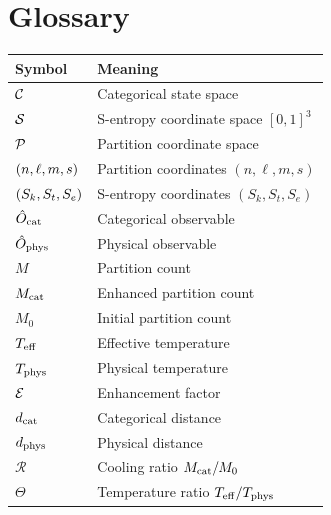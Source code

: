 \section{Glossary}

\begin{center}
\begin{tabular}{ll}
\toprule
\textbf{Symbol} & \textbf{Meaning} \\
\midrule
$\mathcal{C}$ & Categorical state space \\
$\mathcal{S}$ & S-entropy coordinate space $[0,1]^3$ \\
$\mathcal{P}$ & Partition coordinate space \\
$(n,\ell,m,s)$ & Partition coordinates $(n, \ell, m, s)$ \\
$(S_k,S_t,S_e)$ & S-entropy coordinates $(S_k, S_t, S_e)$ \\
$\hat{O}_{\mathrm{cat}}$ & Categorical observable \\
$\hat{O}_{\mathrm{phys}}$ & Physical observable \\
$M$ & Partition count \\
$M_{\mathrm{cat}}$ & Enhanced partition count \\
$M_0$ & Initial partition count \\
$T_{\mathrm{eff}}$ & Effective temperature \\
$T_{\mathrm{phys}}$ & Physical temperature \\
$\mathcal{E}$ & Enhancement factor \\
$d_{\mathrm{cat}}$ & Categorical distance \\
$d_{\mathrm{phys}}$ & Physical distance \\
$\mathcal{R}$ & Cooling ratio $M_{\mathrm{cat}}/M_0$ \\
$\Theta$ & Temperature ratio $T_{\mathrm{eff}}/T_{\mathrm{phys}}$ \\
\bottomrule
\end{tabular}
\end{center}



